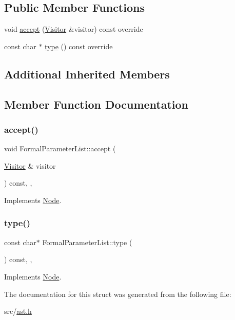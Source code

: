 \subsection*{Public Member Functions}
\begin{DoxyCompactItemize}
\item 
void \hyperlink{struct_formal_parameter_list_a72e69918479534b73b5d8bab43e4abf0}{accept} (\hyperlink{struct_visitor}{Visitor} \&visitor) const override
\item 
const char $\ast$ \hyperlink{struct_formal_parameter_list_a7b0c189969877951f0befb1b42040c60}{type} () const override
\end{DoxyCompactItemize}
\subsection*{Additional Inherited Members}


\subsection{Member Function Documentation}
\mbox{\label{struct_formal_parameter_list_a72e69918479534b73b5d8bab43e4abf0}} 
\subsubsection{\texorpdfstring{accept()}{accept()}}
{\footnotesize\ttfamily void Formal\+Parameter\+List\+::accept (\begin{DoxyParamCaption}\item[{\hyperlink{struct_visitor}{Visitor} \&}]{visitor }\end{DoxyParamCaption}) const\hspace{0.3cm}{\ttfamily [inline]}, {\ttfamily [override]}, {\ttfamily [virtual]}}



Implements \hyperlink{struct_node_a10bd7af968140bbf5fa461298a969c71}{Node}.

\mbox{\label{struct_formal_parameter_list_a7b0c189969877951f0befb1b42040c60}} 
\subsubsection{\texorpdfstring{type()}{type()}}
{\footnotesize\ttfamily const char$\ast$ Formal\+Parameter\+List\+::type (\begin{DoxyParamCaption}{ }\end{DoxyParamCaption}) const\hspace{0.3cm}{\ttfamily [inline]}, {\ttfamily [override]}, {\ttfamily [virtual]}}



Implements \hyperlink{struct_node_a82f29420d0a38efcc370352528e94e9b}{Node}.



The documentation for this struct was generated from the following file\+:\begin{DoxyCompactItemize}
\item 
src/\hyperlink{ast_8h}{ast.\+h}\end{DoxyCompactItemize}
